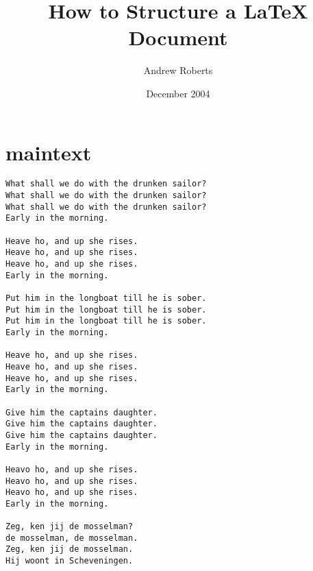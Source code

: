 \documentclass{article}
\begin{document}
\title{How to Structure a LaTeX Document}
\author{Andrew Roberts}
\date{December 2004}
\maketitle
\section*{maintext}

\begin{verbatim}
What shall we do with the drunken sailor?
What shall we do with the drunken sailor?
What shall we do with the drunken sailor?
Early in the morning.

Heave ho, and up she rises.
Heave ho, and up she rises.
Heave ho, and up she rises.
Early in the morning.

Put him in the longboat till he is sober.
Put him in the longboat till he is sober.
Put him in the longboat till he is sober.
Early in the morning.

Heave ho, and up she rises.
Heave ho, and up she rises.
Heave ho, and up she rises.
Early in the morning.

Give him the captains daughter.
Give him the captains daughter.
Give him the captains daughter.
Early in the morning.

Heavo ho, and up she rises.
Heavo ho, and up she rises.
Heavo ho, and up she rises.
Early in the morning.

Zeg, ken jij de mosselman?
de mosselman, de mosselman.
Zeg, ken jij de mosselman.
Hij woont in Scheveningen.
\end{verbatim}
\end{document}

